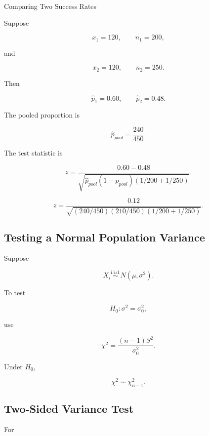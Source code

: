 \begin{workedexamplebox}{Comparing Two Success Rates}

Suppose

\[
x_1=120,
\qquad
n_1=200,
\]

and

\[
x_2=120,
\qquad
n_2=250.
\]

Then

\[
\widehat{p}_1=0.60,
\qquad
\widehat{p}_2=0.48.
\]

The pooled proportion is

\[
\widehat{p}_{pool}
=
\frac{
240
}{
450
}.
\]

The test statistic is

\[
z
=
\frac{
0.60-0.48
}{
\sqrt{
\widehat{p}_{pool}
(1-\widehat{p}_{pool})
\left(
1/200+1/250
\right)
}
}.
\]

\begin{answerbox}
\[
\boxed{
z
=
\frac{
0.12
}{
\sqrt{
(240/450)(210/450)
(1/200+1/250)
}
}.
}
\]
\end{answerbox}

\end{workedexamplebox}

\subsection{Testing a Normal Population Variance}
\label{subsec:test-normal-variance}

Suppose

\[
X_i
\overset{\text{i.i.d.}}{\sim}
N(\mu,\sigma^2).
\]

To test

\[
\boxed{
H_0:\sigma^2=\sigma_0^2,
}
\]

use

\[
\boxed{
\chi^2
=
\frac{
(n-1)S^2
}{
\sigma_0^2
}.
}
\]

Under \(H_0\),

\[
\boxed{
\chi^2
\sim
\chi^2_{n-1}.
}
\]

\subsection{Two-Sided Variance Test}
\label{subsec:two-sided-variance-test}

For

